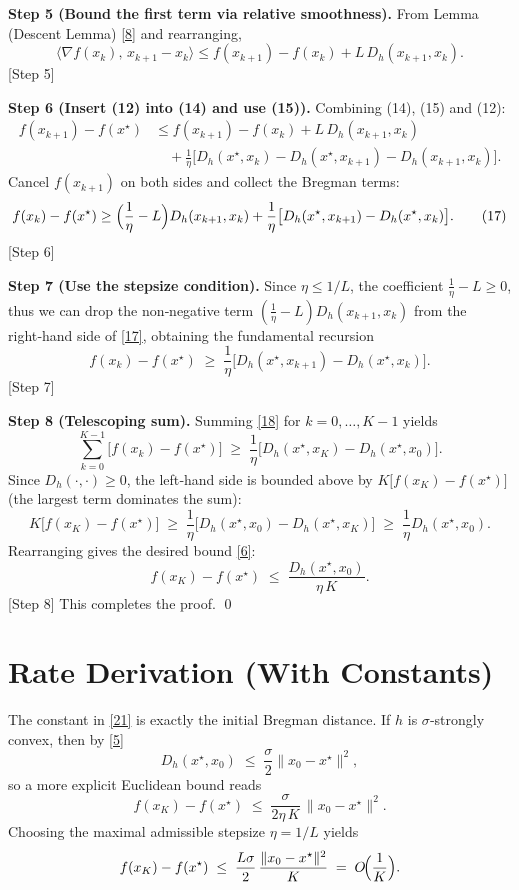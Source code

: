 \documentclass{article}
\begin{document}
\noindent\textbf{Step 5 (Bound the first term via relative smoothness).}
From Lemma (Descent Lemma) \eqref{8} and rearranging,
\[
\langle \nabla f(x_k),\,x_{k+1}-x_k\rangle
\le f(x_{k+1})-f(x_k)+L\,D_h(x_{k+1},x_k).
\tag{15}
\]
[Step 5]

\noindent\textbf{Step 6 (Insert (12) into (14) and use (15)).}
Combining (14), (15) and (12):
\[
\begin{aligned}
f(x_{k+1})-f(x^{\star})
&\le f(x_{k+1})-f(x_k)+L\,D_h(x_{k+1},x_k)
\\
&\quad +\frac{1}{\eta}\bigl[D_h(x^{\star},x_k)-D_h(x^{\star},x_{k+1})
-D_h(x_{k+1},x_k)\bigr].
\end{aligned}
\tag{16}
\]
Cancel $f(x_{k+1})$ on both sides and collect the Bregman terms:
\[
f(x_k)-f(x^{\star})
\ge \Bigl(\frac{1}{\eta}-L\Bigr) D_h(x_{k+1},x_k)
+\frac{1}{\eta}\bigl[D_h(x^{\star},x_{k+1})-D_h(x^{\star},x_k)\bigr].
\tag{17}
\]
[Step 6]

\noindent\textbf{Step 7 (Use the stepsize condition).}
Since $\eta\le 1/L$, the coefficient
$\frac{1}{\eta}-L\ge0$, thus we can drop the non‑negative term
$ (\frac{1}{\eta}-L) D_h(x_{k+1},x_k)$ from the right‑hand side of
\eqref{17}, obtaining the fundamental recursion
\[
f(x_k)-f(x^{\star})
\;\ge\;
\frac{1}{\eta}\bigl[D_h(x^{\star},x_{k+1})-D_h(x^{\star},x_k)\bigr].
\tag{18}
\]
[Step 7]

\noindent\textbf{Step 8 (Telescoping sum).}
Summing \eqref{18} for $k=0,\dots,K-1$ yields
\[
\sum_{k=0}^{K-1}\bigl[f(x_k)-f(x^{\star})\bigr]
\;\ge\;
\frac{1}{\eta}\bigl[D_h(x^{\star},x_{K})-D_h(x^{\star},x_{0})\bigr].
\tag{19}
\]
Since $D_h(\cdot,\cdot)\ge0$, the left‑hand side is bounded above by
$K\bigl[f(x_{K})-f(x^{\star})\bigr]$ (the largest term dominates the sum):
\[
K\bigl[f(x_{K})-f(x^{\star})\bigr]
\;\ge\;
\frac{1}{\eta}\bigl[D_h(x^{\star},x_{0})-D_h(x^{\star},x_{K})\bigr]
\;\ge\;
\frac{1}{\eta}D_h(x^{\star},x_{0}).
\tag{20}
\]
Rearranging gives the desired bound \eqref{6}:
\[
f(x_{K})-f(x^{\star})
\;\le\;
\frac{D_h(x^{\star},x_{0})}{\eta\,K}.
\tag{21}
\]
[Step 8]  This completes the proof. \qed

\section*{Rate Derivation (With Constants)}
The constant in \eqref{21} is exactly the initial Bregman distance.
If $h$ is $\sigma$‑strongly convex, then by \eqref{5}
\[
D_h(x^{\star},x_{0})\;\le\;\frac{\sigma}{2}\|x_{0}-x^{\star}\|^{2},
\]
so a more explicit Euclidean bound reads
\[
f(x_{K})-f(x^{\star})
\;\le\;
\frac{\sigma}{2\eta\,K}\,\|x_{0}-x^{\star}\|^{2}.
\tag{22}
\]
Choosing the maximal admissible stepsize $\eta=1/L$ yields
\[
f(x_{K})-f(x^{\star})
\;\le\;
\frac{L\sigma}{2}\,\frac{\|x_{0}-x^{\star}\|^{2}}{K}
\;=\;O\!\Bigl(\frac{1}{K}\Bigr).
\]
\end{document}
